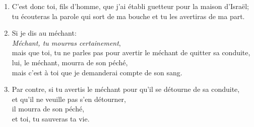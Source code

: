 \documentclass[12pt,a4paper,titlepage]{article}
\def \pslabelsep{0.2em} %
\def \psleftmargin{0em} %
\begin{document}
\begin{enumerate}[leftmargin=\psleftmargin, labelsep = \pslabelsep, label={\arabic*}, font=\color{\pscolor}\small\textsuperscript, parsep=0em, itemsep=0em, topsep=0em ]
\item C’est donc toi, fils d’homme, que j’ai établi guetteur pour la maison d’Israël;\\ tu écouteras la parole qui sort de ma bouche et tu les avertiras de ma part.
\item Si je dis au méchant: \\ \decalage \og{}\emph{Méchant, tu mourras certainement}\fg{},\\ mais que toi, tu ne parles pas pour avertir le méchant de quitter sa conduite, \\ lui, le méchant, mourra de son péché, \\ mais c’est à toi que je demanderai compte de son sang. 
\item Par contre, si tu avertis le méchant pour qu’il se détourne de sa conduite, \\ et qu’il ne veuille pas s’en détourner, \\ il mourra de son péché, \\ et toi, tu sauveras ta vie. \parSpace


\end{enumerate}
\end{document}
